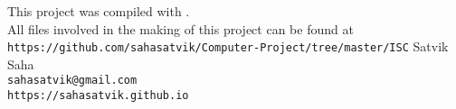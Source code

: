 
\thispagestyle{empty}\addtocounter{page}{-1}
\hspace{0pt}
\vfill
\begin{center}
This project was compiled with \XeLaTeX .\\
\vspace{5mm}
All files involved in the making of this project can be found at
{\tt https://github.com/sahasatvik/Computer-Project/tree/master/ISC}
\vfill
{\fontsize{24}{24}\JennaSue Satvik Saha}\\
{\fontsize{10}{8}\tt sahasatvik@gmail.com}\\
\vspace{-1mm}
{\fontsize{10}{8}\tt https://sahasatvik.github.io}
\end{center}
\hspace{0pt}
